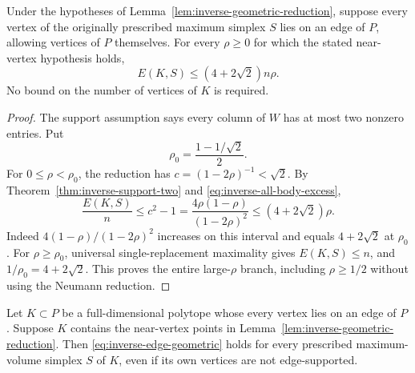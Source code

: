 \begin{theorem}
\label{thm:inverse-edge-simplex}
Under the hypotheses of Lemma~\ref{lem:inverse-geometric-reduction},
suppose every vertex of the originally prescribed maximum simplex
$S$ lies on an edge of $P$, allowing vertices of $P$ themselves.
For every $\rho\geq0$ for which the stated near-vertex hypothesis
holds,
\begin{equation}
 E(K,S)\leq(4+2\sqrt2)n\rho.
 \label{eq:inverse-edge-geometric}
\end{equation}
No bound on the number of vertices of $K$ is required.
\end{theorem}

\begin{proof}
The support assumption says every column of $W$ has at most two
nonzero entries.  Put
\[
 \rho_0=\frac{1-1/\sqrt2}{2}.
\]
For $0\leq\rho<\rho_0$, the reduction has
$c=(1-2\rho)^{-1}<\sqrt2$.  By
Theorem~\ref{thm:inverse-support-two} and
\eqref{eq:inverse-all-body-excess},
\[
 \frac{E(K,S)}n\leq c^2-1
 =\frac{4\rho(1-\rho)}{(1-2\rho)^2}
 \leq(4+2\sqrt2)\rho.
\]
Indeed $4(1-\rho)/(1-2\rho)^2$ increases on this interval and
equals $4+2\sqrt2$ at $\rho_0$.  For $\rho\geq\rho_0$, universal
single-replacement maximality gives $E(K,S)\leq n$, and
$1/\rho_0=4+2\sqrt2$.  This proves the entire large-$\rho$ branch,
including $\rho\geq1/2$ without using the Neumann reduction.
\end{proof}

\begin{theorem}
\label{thm:inverse-edge-body}
Let $K\subset P$ be a full-dimensional polytope whose every vertex
lies on an edge of $P$.  Suppose $K$ contains the near-vertex points
in Lemma~\ref{lem:inverse-geometric-reduction}.  Then
\eqref{eq:inverse-edge-geometric} holds for every prescribed
maximum-volume simplex $S$ of $K$, even if its own vertices are
not edge-supported.
\end{theorem}

